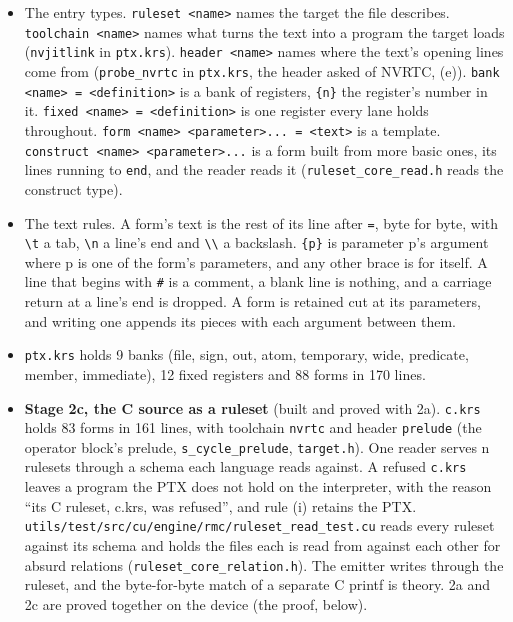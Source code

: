 \begin{enumerate}
\begin{itemize}
\begin{enumerate}
\begin{itemize}
\begin{itemize}
\item The entry types. \texttt{ruleset <name>} names the target the file describes. \texttt{toolchain <name>} names what turns the text into a program the target loads (\texttt{nvjitlink} in \texttt{ptx.\allowbreak{}krs}). \texttt{header <name>} names where the text's opening lines come from (\texttt{probe\_\allowbreak{}nvrtc} in \texttt{ptx.\allowbreak{}krs}, the header asked of NVRTC, (e)). \texttt{bank <name> = <definition>} is a bank of registers, \texttt{\{n\}} the register's number in it. \texttt{fixed <name> = <definition>} is one register every lane holds throughout. \texttt{form <name> <parameter>.\allowbreak{}.\allowbreak{}.\allowbreak{} = <text>} is a template. \texttt{construct <name> <parameter>.\allowbreak{}.\allowbreak{}.\allowbreak{}} is a form built from more basic ones, its lines running to \texttt{end}, and the reader reads it (\texttt{ruleset\_\allowbreak{}core\_\allowbreak{}read.\allowbreak{}h} reads the construct type).
\item The text rules. A form's text is the rest of its line after \texttt{=}, byte for byte, with \texttt{\textbackslash{}t} a tab, \texttt{\textbackslash{}n} a line's end and \texttt{\textbackslash{}\textbackslash{}} a backslash. \texttt{\{p\}} is parameter p's argument where p is one of the form's parameters, and any other brace is for itself. A line that begins with \texttt{\#} is a comment, a blank line is nothing, and a carriage return at a line's end is dropped. A form is retained cut at its parameters, and writing one appends its pieces with each argument between them.
\item \texttt{ptx.\allowbreak{}krs} holds 9 banks (file, sign, out, atom, temporary, wide, predicate, member, immediate), 12 fixed registers and 88 forms in 170 lines.
\item \textbf{Stage 2c, the C source as a ruleset} (built and proved with 2a). \texttt{c.\allowbreak{}krs} holds 83 forms in 161 lines, with toolchain \texttt{nvrtc} and header \texttt{prelude} (the operator block's prelude, \texttt{s\_\allowbreak{}cycle\_\allowbreak{}prelude}, \texttt{target.\allowbreak{}h}). One reader serves n rulesets through a schema each language reads against. A refused \texttt{c.\allowbreak{}krs} leaves a program the PTX does not hold on the interpreter, with the reason “its C ruleset, c.krs, was refused”, and rule (i) retains the PTX. \texttt{utils/\allowbreak{}test/\allowbreak{}src/\allowbreak{}cu/\allowbreak{}engine/\allowbreak{}rmc/\allowbreak{}ruleset\_\allowbreak{}read\_\allowbreak{}test.\allowbreak{}cu} reads every ruleset against its schema and holds the files each is read from against each other for absurd relations (\texttt{ruleset\_\allowbreak{}core\_\allowbreak{}relation.\allowbreak{}h}). The emitter writes through the ruleset, and the byte-for-byte match of a separate C printf is theory. 2a and 2c are proved together on the device (the proof, below).

\end{itemize}
\end{itemize}
\end{enumerate}
\end{itemize}
\end{enumerate}
